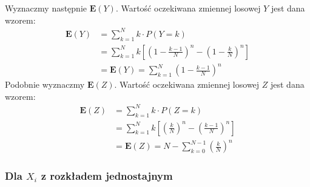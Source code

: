 \documentclass{article}
\begin{document}
Wyznaczmy następnie $\mathbf{E}(Y)$. Wartość oczekiwana zmiennej losowej $Y$ jest dana wzorem:
\begin{align}
    \mathbf{E}(Y) &= \sum_{k=1}^N k \cdot P(Y = k)\\
    &= \sum_{k=1}^N k \left[\left(1 - \frac{k-1}{N}\right)^n - \left(1 - \frac{k}{N}\right)^n\right]\\
    &= \mathbf{E}(Y) = \sum_{k=1}^N \left(1 - \frac{k-1}{N}\right)^n
\end{align}
Podobnie wyznaczmy $\mathbf{E}(Z)$. Wartość oczekiwana zmiennej losowej $Z$ jest dana wzorem:
\begin{align}
    \mathbf{E}(Z) &= \sum_{k=1}^N k \cdot P(Z = k)\\
    &= \sum_{k=1}^N k \left[\left(\frac{k}{N}\right)^n - \left(\frac{k-1}{N}\right)^n\right]\\
    &= \mathbf{E}(Z) = N - \sum_{k=0}^{N-1} \left(\frac{k}{N}\right)^n
\end{align}

\subsubsection*{Dla $X_i$ z rozkładem jednostajnym}
\end{document}
